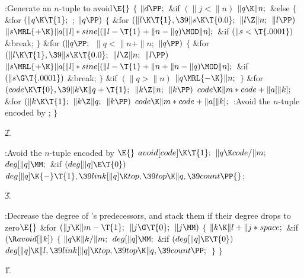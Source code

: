 \Y\B\4:Generate an $n$-tuple to avoid\X${}\E{}$\6
${}\{{}$\1\6
${}\|d\PP;{}$\6
\&{if} ${}(\|j<\|n){}$\1\5
${}\|q\K\|n;{}$\2\6
\&{else}\5
${}\{{}$\1\6
\&{for} ${}(\|q\K\T{1};{}$  ; ${}\|q\PP){}$\5
${}\{{}$\1\6
\&{for} ${}(\|l\K\T{1},\39\|s\K\T{0.0};{}$ ${}\|l\Z\|n;{}$ ${}\|l\PP){}$\1\5
${}\|s\MRL{+{\K}}\|a[\|l]*\\{sine}[(\|l-\T{1}+\|n-\|q)\MOD\|n];{}$\2\6
\&{if} ${}(\|s<\T{.0001}){}$\1\5
\&{break};\2\6
\4${}\}{}$\2\6
\&{for} ${}(\|q\PP;{}$ ${}\|q<\|n+\|n;{}$ ${}\|q\PP){}$\5
${}\{{}$\1\6
\&{for} ${}(\|l\K\T{1},\39\|s\K\T{0.0};{}$ ${}\|l\Z\|n;{}$ ${}\|l\PP){}$\1\5
${}\|s\MRL{+{\K}}\|a[\|l]*\\{sine}[(\|l-\T{1}+\|n+\|n-\|q)\MOD\|n];{}$\2\6
\&{if} ${}(\|s\G\T{.0001}){}$\1\5
\&{break};\2\6
\4${}\}{}$\2\6
\&{if} ${}(\|q>\|n){}$\1\5
${}\|q\MRL{-{\K}}\|n;{}$\2\6
\4${}\}{}$\2\6
\&{for} ${}(\\{code}\K\T{0},\39\|k\K\|q+\T{1};{}$ ${}\|k\Z\|n;{}$ ${}\|k\PP){}$%
\1\5
${}\\{code}\K\|m*\\{code}+\|a[\|k];{}$\2\6
\&{for} ${}(\|k\K\T{1};{}$ ${}\|k\Z\|q;{}$ ${}\|k\PP){}$\1\5
${}\\{code}\K\|m*\\{code}+\|a[\|k];{}$\2\6
:Avoid the $n$-tuple encoded by \X;\6
\4${}\}{}$\2\par
\U2.\fi

\B{}:Avoid the $n$-tuple encoded by \X${}%
\E{}$\6
$\\{avoid}[\\{code}]\K\T{1};{}$\6
${}\|q\K\\{code}/\|m;{}$\6
${}\\{deg}[\|q]\MM;{}$\6
\&{if} ${}(\\{deg}[\|q]\E\T{0}){}$\1\5
${}\\{deg}[\|q]\K{-}\T{1},\39\\{link}[\|q]\K\\{top},\39\\{top}\K\|q,\39%
\\{count}\PP{}$;\2\par
\U3.\fi

\B{}:Decrease the degree of 's predecessors,
and stack them if their degree drops to zero\X${}\E{}$\6
\&{for} ${}(\|j\K\|m-\T{1};{}$ ${}\|j\G\T{0};{}$ ${}\|j\MM){}$\5
${}\{{}$\1\6
${}\|k\K\|l+\|j*\\{space};{}$\6
\&{if} ${}(\R\\{avoid}[\|k]){}$\5
${}\{{}$\1\6
${}\|q\K\|k/\|m;{}$\6
${}\\{deg}[\|q]\MM;{}$\6
\&{if} ${}(\\{deg}[\|q]\E\T{0}){}$\1\5
${}\\{deg}[\|q]\K\|l,\39\\{link}[\|q]\K\\{top},\39\\{top}\K\|q,\39\\{count}%
\PP;{}$\2\6
\4${}\}{}$\2\6
\4${}\}{}$\2\par
\U1.\fi

